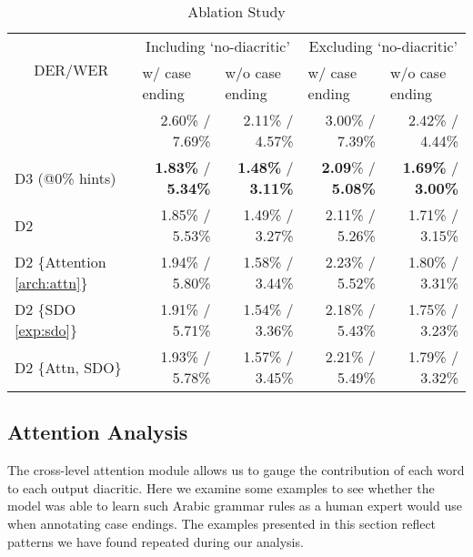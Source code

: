 \documentclass[11pt]{article}
\begin{document}
\begin{table}[h]
\centering
\begin{tabular}{|l|r|r|r|r|}
\hline
\multicolumn{1}{|c|}{\multirow{2}{*}{DER/WER}} & \multicolumn{2}{c|}{Including `no-diacritic'}                              & \multicolumn{2}{c|}{Excluding `no-diacritic'}                              \\ \cline{2-5} 
\multicolumn{1}{|c|}{}                         & \multicolumn{1}{l|}{w/ case ending} & \multicolumn{1}{l|}{w/o case ending} & \multicolumn{1}{l|}{w/ case ending} & \multicolumn{1}{l|}{w/o case ending} \\ \hline
\cite{fadel19-neural}                          & 2.60\% / 7.69\%                     & 2.11\% / 4.57\%                      & 3.00\% / 7.39\%                     & 2.42\% / 4.44\%                      \\ \hline
D3 (@0\% hints)                                & \textbf{1.83\%} / \textbf{5.34\%}  & \textbf{1.48\%} / \textbf{3.11\%}  & \textbf{2.09}\%  / \textbf{5.08\%}     & \textbf{1.69\%} / \textbf{3.00\%}    \\ \hline
D2                                             & 1.85\% / 5.53\%                     & 1.49\% / 3.27\%                      & 2.11\% / 5.26\%                     & 1.71\% / 3.15\%                      \\ \hline
D2  \{Attention \ref{arch:attn}\}           & 1.94\% / 5.80\%                     & 1.58\% / 3.44\%                      & 2.23\% / 5.52\%                     & 1.80\% / 3.31\%                      \\ \hline
D2  \{SDO \ref{exp:sdo}\}                   & 1.91\% / 5.71\%                     & 1.54\% / 3.36\%                      & 2.18\% / 5.43\%                     & 1.75\% / 3.23\%                      \\ \hline
D2  \{Attn, SDO\}                           & 1.93\% / 5.78\%                     & 1.57\% / 3.45\%                      & 2.21\% / 5.49\%                     & 1.79\% / 3.32\%                      \\ \hline
\end{tabular}
\caption{Ablation Study}
\label{tab:ablation}
\end{table}

\subsection{Attention Analysis}

The cross-level attention module allows us to gauge the contribution of each word to each output diacritic. Here we examine some examples to see whether the model was able to learn such Arabic grammar rules as a human expert would use when annotating case endings. The examples presented in this section reflect patterns we have found repeated during our analysis.
\end{document}
